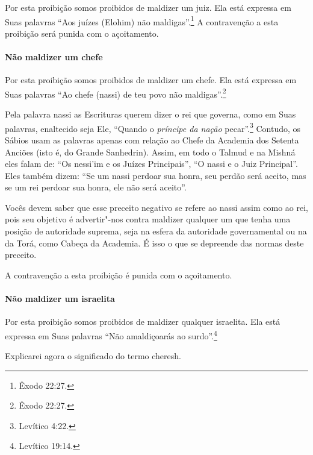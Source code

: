 \begin{multicols}{2}
Por esta proibição somos proibidos de maldizer um juiz. Ela está
expressa em Suas palavras ``Aos juízes (Elohim\starr) não maldigas''.\footnote{Êxodo
22:27.} A contravenção a esta proibição será punida com o açoitamento.

\paragraph{Não maldizer um chefe}

Por esta proibição somos proibidos de maldizer um chefe. Ela está
expressa em Suas palavras ``Ao chefe (nassi\starr) de teu povo não maldigas''.\footnote{Êxodo 22:27.}

Pela palavra nassi\starr{} as Escrituras querem dizer o
rei que governa, como em Suas palavras, enaltecido seja Ele, ``Quando o
\emph{príncipe da nação} pecar''.\footnote{Levítico 4:22.} Contudo, os Sábios
usam as palavras apenas com relação ao Chefe da Academia dos Setenta
Anciões (isto é, do Grande Sanhedrin\starr). Assim, em todo o Talmud\starr{} e na
Mishná\starr{} eles falam de: ``Os nessi'im\starr{} e os Juízes Principais'', ``O
nassi\starr{} e o Juiz Principal''. Eles também dizem: ``Se um nassi\starr{} perdoar
sua honra, seu perdão será aceito, mas se um rei perdoar sua honra, ele
não será aceito''.

Vocês devem saber que esse preceito negativo se refere ao nassi\starr{} assim
como ao rei, pois seu objetivo é advertir"-nos contra maldizer qualquer
um que tenha uma posição de autoridade suprema, seja na esfera da
autoridade governamental ou na da Torá\starr, como Cabeça da Academia. É
isso o que se depreende das normas deste preceito.

A contravenção a esta proibição é punida com o açoitamento.

\paragraph{Não maldizer um israelita}

Por esta proibição somos proibidos de maldizer qualquer israelita. Ela
está expressa em Suas palavras ``Não amaldiçoarás ao surdo''.\footnote{Levítico
19:14.}

Explicarei agora o significado do termo cheresh\starr.


\end{multicols}
